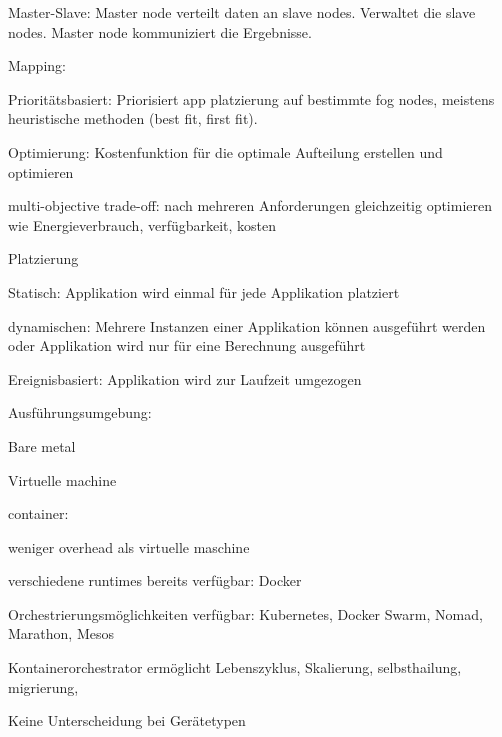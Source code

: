 \begin{notes}
\begin{notes}
\begin{notes}
\begin{notes}
                \item Master-Slave: Master node verteilt daten an slave nodes. Verwaltet die slave nodes. Master node kommuniziert die Ergebnisse.
            \end{notes}
            \item Mapping:
            \begin{notes}
                \item Prioritätsbasiert: Priorisiert app platzierung auf bestimmte fog nodes, meistens heuristische methoden (best fit, first fit). 
                \item Optimierung: Kostenfunktion für die optimale Aufteilung erstellen und optimieren
                \item multi-objective trade-off: nach mehreren Anforderungen gleichzeitig optimieren wie Energieverbrauch, verfügbarkeit, kosten
            \end{notes}
            \item Platzierung
            \begin{notes}
                \item Statisch: Applikation wird einmal für jede Applikation platziert
                \item dynamischen: Mehrere Instanzen einer Applikation können ausgeführt werden oder Applikation wird nur für eine Berechnung ausgeführt
                \item Ereignisbasiert: Applikation wird zur Laufzeit umgezogen
            \end{notes}
            \item Ausführungsumgebung:
            \begin{notes}
                \item Bare metal
                \item Virtuelle machine
                \item container: \cite{Costa2022}
                \item   weniger overhead als virtuelle maschine
                \item   verschiedene runtimes bereits verfügbar: Docker
                \item   Orchestrierungsmöglichkeiten verfügbar: Kubernetes, Docker Swarm, Nomad, Marathon, Mesos
                \item   Kontainerorchestrator ermöglicht Lebenszyklus, Skalierung, selbsthailung, migrierung, 
                \item   Keine Unterscheidung bei Gerätetypen

\end{notes}
\end{notes}
\end{notes}
\end{notes}
